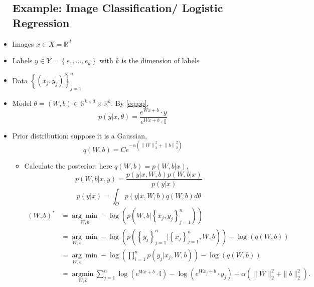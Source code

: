 \begin{itemize}
\subsection{Example: Image  Classification/ Logistic Regression}
\item Images $x \in X=\mathbb{R}^{d}$
\item Labels $y \in Y=\left\{e_{1}, \ldots, e_{k}\right\}$ with $k$ is the dimension of labels
\item Data $\left\{(x_{j},y_{j})\right\}_{j=1}^{n}$
\item Model $\theta=(W, b) \in \mathbb{R}^{k \times d} \times \mathbb{R}^{k}$. By \eqref{eq:pp},
$$
p(y | x, \theta)=\frac{e^{Wx+b} \cdot y}{e^{Wx+b} \cdot \mathbb{I}}
$$
\item Prior distribution: suppose it is a Gaussian,
$$
q(W, b)=C e^{-\alpha\left(\left\|W\right\|_{2}^{2}+ \left\|b\right\|_{2}^{2}\right)}
$$


\begin{itemize}
	\item Calculate the posterior: here $q(W,b)=p(W, b|x)$,
	$$
	p(W, b | x, y)=\frac{p(y | x, W, b) p(W, b|x) }{p(y | x)} 
	$$
	$$
	p(y | x)=\int_{\Theta} p(y|x, W, b) q(W, b) d \theta
	$$
	\begin{align*}
	(W, b)^{*}&=\underset{W,b}{\arg \min }-\log \left( p\left(W, b |\left\{x_{j},y_{j}\right\}_{j=1}^{n}\right)\right) \\
&=\underset {W,b}\arg  \min -\log \left( p\left(\left\lbrace y_{j}\right\rbrace _{j=1}^{n} | \left\lbrace x_{j}\right\rbrace _{j=1}^{n}, W, b\right)\right)-\log (q(W, b))\\
&=\underset {W,b}\arg  \min	-\log \left(\prod_{i=1}^{n} p\left(y_{j} | x_{j}, W, b\right)\right)-\log (q(W, b))\\
&=\underset{W, b}{\operatorname{argmin}} \sum_{j=1}^{n} \log \left(e^{Wx+b} \cdot \mathbb{I}\right)-\log \left(e^{Wx_j+b} \cdot y_{j}\right)+\alpha\left(\|W\|_{2}^{2}+\| b\|_{2}^{2}\right).
	\end{align*}


\end{itemize}

\end{itemize}




%
%
%
%
%
%
%
%
%
%
%
